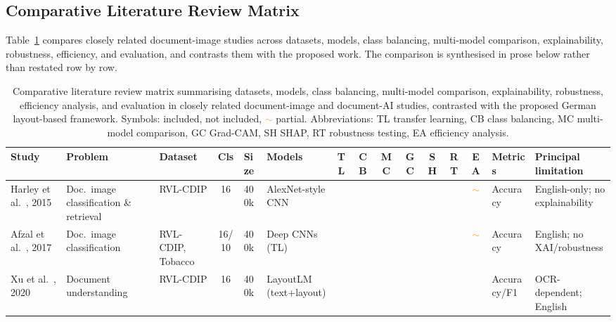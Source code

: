 \documentclass[preprint,12pt]{elsarticle}
\newcommand{\cmark}{\ding{51}} %
\newcommand{\xmark}{\ding{55}} %
\newcommand{\pmark}{\textcolor{orange}{$\sim$}} %
\begin{document}
\subsection{Comparative Literature Review Matrix}
Table~\ref{tab:literature_matrix} compares closely related document-image studies
across datasets, models, class balancing, multi-model comparison, explainability,
robustness, efficiency, and evaluation, and contrasts them with the proposed
work.
The comparison is synthesised in prose below rather than restated row by row.

\begin{table}[!ht]
\centering
\caption{Comparative literature review matrix summarising datasets, models,
class balancing, multi-model comparison, explainability, robustness, efficiency
analysis, and evaluation in closely related document-image and document-AI
studies, contrasted with the proposed German layout-based framework. Symbols:
\cmark{} included, \xmark{} not included, \pmark{} partial. Abbreviations:
TL transfer learning, CB class balancing, MC multi-model comparison,
GC Grad-CAM, SH SHAP, RT robustness testing, EA efficiency analysis.}
\label{tab:literature_matrix}
\scriptsize
\begin{adjustbox}{max width=\textwidth}
\begin{tabular}{p{2.0cm} p{2.1cm} p{1.7cm} c p{1.2cm} p{2.1cm} c c c c c c c p{2.2cm} p{2.5cm}}
\toprule
\textbf{Study} & \textbf{Problem} & \textbf{Dataset} & \textbf{Cls} & \textbf{Size} & \textbf{Models} & \textbf{TL} & \textbf{CB} & \textbf{MC} & \textbf{GC} & \textbf{SH} & \textbf{RT} & \textbf{EA} & \textbf{Metrics} & \textbf{Principal limitation} \\
\midrule
Harley et al.\ \cite{harley2015evaluation}, 2015 & Doc.\ image classification \& retrieval & RVL-CDIP & 16 & 400k & AlexNet-style CNN & \cmark & \xmark & \cmark & \xmark & \xmark & \xmark & \pmark & Accuracy & English-only; no explainability \\
Afzal et al.\ \cite{afzal2017cutting}, 2017 & Doc.\ image classification & RVL-CDIP, Tobacco & 16/10 & 400k & Deep CNNs (TL) & \cmark & \xmark & \cmark & \xmark & \xmark & \xmark & \pmark & Accuracy & English; no XAI/robustness \\
Xu et al.\ \cite{xu2020layoutlm}, 2020 & Document understanding & RVL-CDIP & 16 & 400k & LayoutLM (text+layout) & \cmark & \xmark & \cmark & \xmark & \xmark & \xmark & \xmark & Accuracy/F1 & OCR-dependent; English \\

\end{tabular}
\end{adjustbox}
\end{table}
\end{document}
